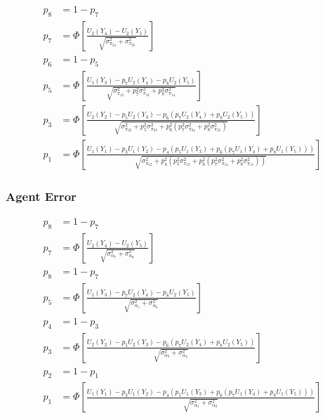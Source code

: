 \documentclass{article}
\begin{document}
\begin{align*}
  p_{8} &= 1 - p_{7} \\
  p_{7} &= \Phi
  \left[
    \frac{U_{2}(Y_{4}) - U_{2}(Y_{5})}
    {\sqrt{\sigma^{2}_{\pi_{24}} + \sigma^{2}_{\pi_{25}}}} 
  \right] \\
  p_{6} &= 1 - p_{5} \\
  p_{5} &= \Phi
  \left[
    \frac{U_{1}(Y_{3}) - p_{7} U_{2}(Y_{4}) - p_{8} U_{2}(Y_{5})}
    {\sqrt{\sigma^{2}_{\pi_{12}} + p_{7}^{2} \sigma^{2}_{\pi_{13}} + p_{8}^{2} \sigma^{2}_{\pi_{14}}}} 
  \right] \\
  p_{3} &= \Phi
  \left[
    \frac{U_{2}(Y_{2}) - p_{5} U_{2}(Y_{3}) - p_{6} \left( p_{7} U_{2}(Y_{4}) + p_{8} U_{2}(Y_{5}) \right)}
    {\sqrt{\sigma^{2}_{\pi_{22}} + p_{5}^{2} \sigma^{2}_{\pi_{23}} + 
        p_{6}^{2} \left( p_{7}^{2} \sigma^{2}_{\pi_{24}} + p_{8}^{2} \sigma^{2}_{\pi_{25}}\right) }} 
  \right] \\
  p_{1} &= \Phi
  \left[
    \frac{U_{1}(Y_{1}) - p_{3} U_{1}(Y_{2}) - p_{4}
      \left(
        p_{5} U_{1}(Y_{3}) + p_{6} 
        \left( 
          p_{7} U_{1}(Y_{4}) + p_{8} U_{1}(Y_{5}) 
        \right)
      \right)
    }
    {\sqrt{\sigma^{2}_{\pi_{12}} + p_{4}^{2}
        \left(
          p_{5}^{2} \sigma^{2}_{\pi_{13}} + 
          p_{6}^{2} \left( p_{7}^{2} \sigma^{2}_{\pi_{14}} + p_{8}^{2} \sigma^{2}_{\pi_{15}} \right)
        \right)}}
  \right] 
\end{align*}

\subsubsection{Agent Error}

\begin{align*}
  p_{8} &= 1 - p_{7} \\
  p_{7} &= \Phi
  \left[
    \frac{U_{2}(Y_{4}) - U_{2}(Y_{5})}
    {\sqrt{ \sigma^{2}_{\alpha_{7}} + \sigma^{2}_{\alpha_{8}}}}
  \right] \\
  p_{8} &= 1 - p_{7} \\
  p_{5} &= \Phi
  \left[
    \frac{U_{1}(Y_{3}) - p_{7} U_{2}(Y_{4}) - p_{8} U_{2}(Y_{5})}
    {\sqrt{ \sigma^{2}_{\alpha_{5}} + \sigma^{2}_{\alpha_{6}}}}
  \right] \\
  p_{4} &= 1 - p_{3} \\
  p_{3} &= \Phi
  \left[
    \frac{U_{2}(Y_{2}) - p_{5} U_{2}(Y_{3}) - p_{6} \left( p_{7} U_{2}(Y_{4}) + p_{8} U_{2}(Y_{5}) \right)}
    {\sqrt{ \sigma^{2}_{\alpha_{3}} + \sigma^{2}_{\alpha_{4}}}}
  \right] \\
  p_{2} &= 1 - p_{1} \\
  p_{1} &= \Phi
  \left[
    \frac{U_{1}(Y_{1}) - p_{3} U_{1}(Y_{2}) - p_{4}
      \left(
        p_{5} U_{1}(Y_{3}) + p_{6} \left( p_{7} U_{1}(Y_{4}) + p_{8} U_{1}(Y_{5}) \right)
      \right)}
    {\sqrt{ \sigma^{2}_{\alpha_{1}} + \sigma^{2}_{\alpha_{2}}}}
  \right] 
\end{align*}
\end{document}
